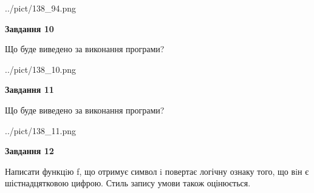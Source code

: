 \documentclass[12pt, ukrainian]{article}
\begin{document}
{\begin {large}
\begin{center}
	{../pict/138_94.png}
\end{center}
\newpage

{\begin {center}\textbf{Завдання 10}\end {center}}

Що буде виведено за виконання програми?\par
\begin{center}
	{../pict/138_10.png}
\end{center}
\newpage

{\begin {center}\textbf{Завдання 11}\end {center}}

Що буде виведено за виконання програми?\par
\begin{center}
	{../pict/138_11.png}
\end{center}
\newpage

{\begin {center}\textbf{Завдання 12}\end {center}}


Написати функцiю f, що отримує символ i повертає логічну ознаку того, що вiн є шістнадцятковою цифрою. Стиль запису умови також оцінюється.\par
\newpage

\end {large}}
\end{document}
